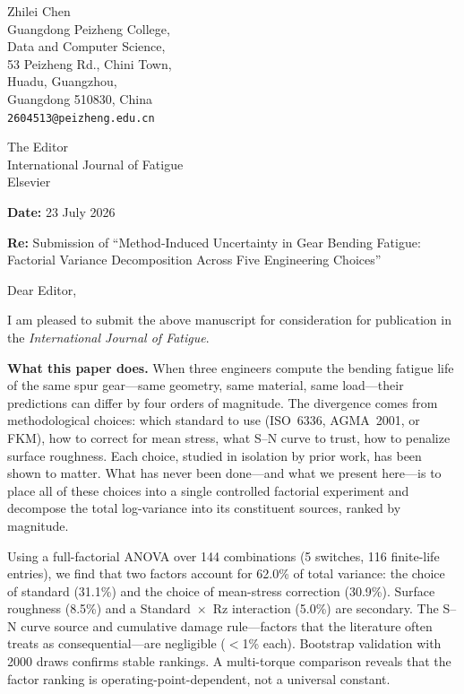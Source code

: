 \documentclass[12pt,a4paper]{article}
\begin{document}
\thispagestyle{empty}

\vspace*{1cm}
\hfill\begin{minipage}{0.45\textwidth}
\raggedleft
Zhilei Chen\\
Guangdong Peizheng College,\\
Data and Computer Science,\\
53 Peizheng Rd., Chini Town,\\
Huadu, Guangzhou,\\
Guangdong 510830, China\\[4pt]
\texttt{2604513@peizheng.edu.cn}
\end{minipage}

\vspace{1cm}
\noindent The Editor\\
International Journal of Fatigue\\
Elsevier

\vspace{0.8cm}
\noindent\textbf{Date:} 23 July 2026

\vspace{0.3cm}
\noindent\textbf{Re:} Submission of ``Method-Induced Uncertainty in
Gear Bending Fatigue: Factorial Variance Decomposition Across Five
Engineering Choices''

\vspace{0.8cm}
\noindent Dear Editor,

\vspace{0.3cm}
I am pleased to submit the above manuscript for consideration for
publication in the \textit{International Journal of Fatigue}.

\vspace{0.3cm}
\noindent\textbf{What this paper does.}
When three engineers compute the bending fatigue life of the same spur
gear---same geometry, same material, same load---their predictions can differ
by four orders of magnitude. The divergence comes from methodological choices:
which standard to use (ISO~6336, AGMA~2001, or FKM), how to correct for mean
stress, what S--N curve to trust, how to penalize surface roughness. Each
choice, studied in isolation by prior work, has been shown to matter.
What has never been done---and what we present here---is to place all
of these choices into a single controlled factorial experiment and decompose
the total log-variance into its constituent sources, ranked by magnitude.

Using a full-factorial ANOVA over 144 combinations (5 switches, 116
finite-life entries), we find that two factors account for 62.0\% of total
variance: the choice of standard (31.1\%) and the choice of mean-stress
correction (30.9\%). Surface roughness (8.5\%) and a Standard~$\times$~Rz
interaction (5.0\%) are secondary. The S--N curve source and cumulative
damage rule---factors that the literature often treats as consequential---are
negligible ($<$1\% each). Bootstrap validation with 2000 draws confirms
stable rankings. A multi-torque comparison reveals that the factor ranking
is operating-point-dependent, not a universal constant.
\end{document}
